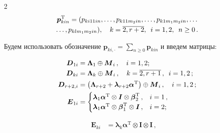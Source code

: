 \begin{multicols}{2}
\begin{multline*}
\boldsymbol{p}_{kin}^{\mathrm{T}}=(p_{ki11in},\ldots,p_{k11m_2in},\ldots,p_{k1m_1m_2in},

\ldots\\

\ldots,

p_{klm_1m_2in}),\quad k=\overline{2,r+2},\enskip i=1,2, \enskip n\geq 0\,.

\end{multline*}

Будем использовать обозначение $\boldsymbol{p}_{ki,\cdot}=\sum\limits_{n\geq 0} \boldsymbol{p}_{kin}$ и введем матрицы:

\begin{align*}

\boldsymbol{D}_{1i}&=\boldsymbol{\Lambda}_1\oplus \boldsymbol{M}_i\,,\quad i=1,2;\\

\boldsymbol{D}_{ki}&=\boldsymbol{\Lambda}_k\oplus \boldsymbol{M}_i\,,\quad k=\overline{2,r+1}\,,\enskip i=1,2\,;\\

\boldsymbol{D}_{r+2,i}&=\left(\boldsymbol{\Lambda}_{r+2}+ \boldsymbol{\lambda}_{r+2}\boldsymbol{\alpha}^{\mathrm{T}}\right)\oplus \boldsymbol{M}_i\,,\quad i=1,2\,;\\

\boldsymbol{E}_{1i}&=

\begin{cases}

\boldsymbol{\lambda}_1\boldsymbol{\alpha}^{\mathrm{T}}\otimes\boldsymbol{I}\otimes

\boldsymbol{\beta}_2^{\mathrm{T}}\,, & i=1\,,\\

\boldsymbol{\lambda}_1\boldsymbol{\alpha}^{\mathrm{T}}\otimes

\boldsymbol{\beta}_1^{\mathrm{T}}  \otimes\boldsymbol{I}\,, & i=2;

\end{cases}

\end{align*}

\begin{align*}



\boldsymbol{E}_{ki}&=\boldsymbol{\lambda}_k\boldsymbol{\alpha}^{\mathrm{T}} \otimes\boldsymbol{I}\otimes\boldsymbol{I}\,,\quad


\end{align*}
\end{multicols}
